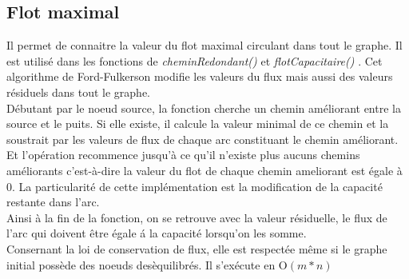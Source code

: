 \documentclass[onecolumn, 12pt]{article}
\begin{document}
\subsection{ Flot maximal }
Il permet de connaitre la valeur du flot maximal circulant dans tout le graphe. Il est utilis\'e dans les fonctions de \emph{cheminRedondant()} et \emph{flotCapacitaire() }. Cet algorithme de Ford-Fulkerson modifie les valeurs du flux mais aussi des valeurs r\'esiduels dans tout le graphe.\\
D\'ebutant par le noeud source, la fonction cherche un chemin am\'eliorant entre la source et le puits. Si elle existe, il calcule la valeur minimal de ce chemin et la soustrait par les valeurs de flux de chaque arc constituant le chemin am\'eliorant. Et l'op\'eration recommence jusqu'\`a ce qu'il n'existe plus aucuns chemins am\'eliorants c'est-\`a-dire la valeur du flot de chaque chemin ameliorant est \'egale \`a 0.
La particularit\'e de cette impl\'ementation est la modification de la capacit\'e restante dans l'arc. \\
Ainsi \`a la fin de la fonction, on se retrouve avec la valeur r\'esiduelle, le flux de l'arc qui doivent \^etre \'egale \'a la capacit\'e lorsqu'on les somme.\\
Consernant la loi de conservation de flux, elle est respect\'ee m\^eme si le graphe initial poss\`ede des noeuds des\`equilibr\'es.
Il s'ex\'ecute en $\mathrm{O}{(m*n)}$
\\
\end{document}
